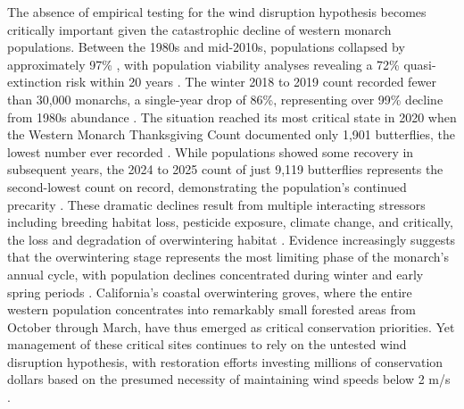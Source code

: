 The absence of empirical testing for the wind disruption hypothesis becomes critically important given the catastrophic decline of western monarch populations. Between the 1980s and mid-2010s, populations collapsed by approximately 97\% \citep{schultzCitizenScienceMonitoring2017}, with population viability analyses revealing a 72\% quasi-extinction risk within 20 years \citep{schultzCitizenScienceMonitoring2017}. The winter 2018 to 2019 count recorded fewer than 30,000 monarchs, a single-year drop of 86\%, representing over 99\% decline from 1980s abundance \citep{peltonWesternMonarchPopulation2019}. The situation reached its most critical state in 2020 when the Western Monarch Thanksgiving Count documented only 1,901 butterflies, the lowest number ever recorded \citep{xercessocietyWesternMonarchThanksgiving2025}. While populations showed some recovery in subsequent years, the 2024 to 2025 count of just 9,119 butterflies represents the second-lowest count on record, demonstrating the population's continued precarity \citep{xercessocietyWesternMonarchThanksgiving2025}. These dramatic declines result from multiple interacting stressors including breeding habitat loss, pesticide exposure, climate change, and critically, the loss and degradation of overwintering habitat \citep{croneWhyAreMonarch2019,peltonWesternMonarchPopulation2019}. Evidence increasingly suggests that the overwintering stage represents the most limiting phase of the monarch's annual cycle, with population declines concentrated during winter and early spring periods \citep{peltonWesternMonarchPopulation2019,mariniDensitydependenceDecliningPopulation2017}. California's coastal overwintering groves, where the entire western population concentrates into remarkably small forested areas from October through March, have thus emerged as critical conservation priorities. Yet management of these critical sites continues to rely on the untested wind disruption hypothesis, with restoration efforts investing millions of conservation dollars based on the presumed necessity of maintaining wind speeds below 2 m/s \citep{althouse&meadeinc.EllwoodMesaSperling2023,themonarchpressCityAwarded392019}.

